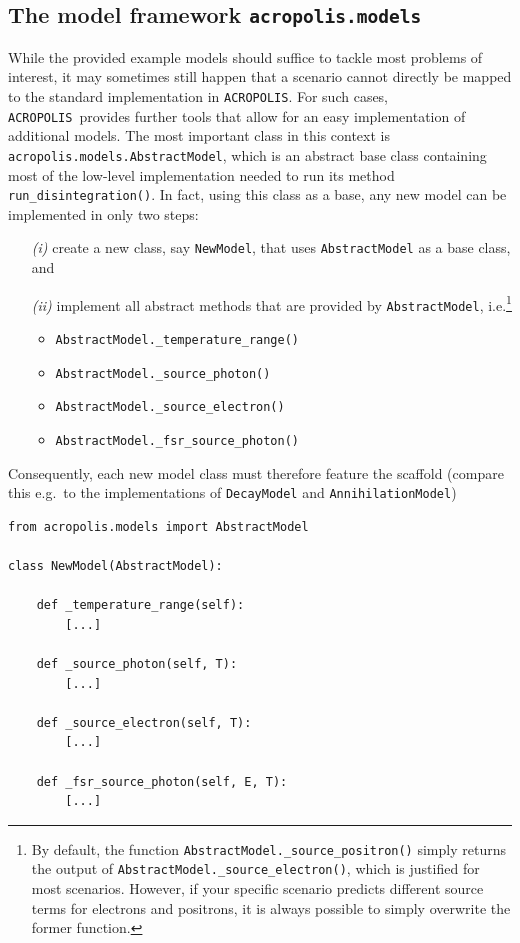 \documentclass[11pt,a4paper]{article}
\newcommand{\acropolis}{\texttt{ACROPOLIS}~}
\begin{document}
\subsection{The model framework \texttt{acropolis.models}}
While the provided example models should suffice to tackle most problems of interest, it may sometimes still happen that a scenario cannot directly be mapped to the standard implementation in \texttt{ACROPOLIS}. For such cases, \acropolis provides further tools that allow for an easy implementation of additional models.
The most important class in this context is \texttt{acropolis.models.AbstractModel}, which is an abstract base class containing most of the low-level implementation needed to run its method \texttt{run\_disintegration()}. In fact, using this class as a base, any new model can be implemented in only two steps:
\begin{enumerate}
\item[\textit{(i)}] create a new class, say \texttt{NewModel}, that uses \texttt{AbstractModel} as a base class, and
\item[\textit{(ii)}]  implement all abstract methods that are provided by \texttt{AbstractModel}, i.e.\footnote{By default, the function \texttt{AbstractModel.\_source\_positron()} simply returns the output of \texttt{AbstractModel.\_source\_electron()}, which is justified for most scenarios. However, if your specific scenario predicts different source terms for electrons and positrons, it is always possible to simply overwrite the former function.}
\begin{itemize}
	\item \texttt{AbstractModel.\_temperature\_range()}
	\item \texttt{AbstractModel.\_source\_photon()}
	\item \texttt{AbstractModel.\_source\_electron()}
	\item \texttt{AbstractModel.\_fsr\_source\_photon()}
\end{itemize}
\end{enumerate}
Consequently, each new model class must therefore feature the scaffold (compare this e.g.\ to the implementations of \texttt{DecayModel} and \texttt{AnnihilationModel})
\begin{lstlisting}
from acropolis.models import AbstractModel

class NewModel(AbstractModel):

	def _temperature_range(self):
		[...]

	def _source_photon(self, T):
		[...]

	def _source_electron(self, T):
		[...]

	def _fsr_source_photon(self, E, T):
		[...]

\end{lstlisting}
\end{document}
